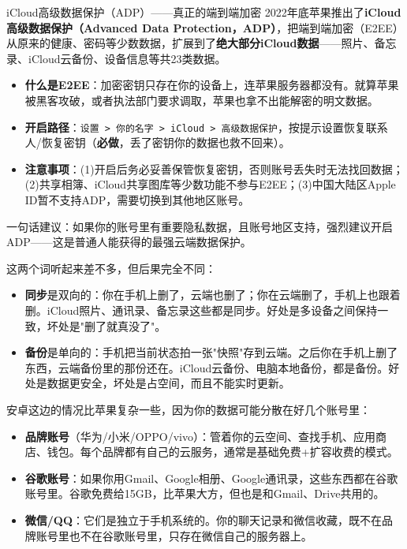 \begin{tcbwarn}{iCloud高级数据保护（ADP）——真正的端到端加密}
2022年底苹果推出了\textbf{iCloud高级数据保护（Advanced Data Protection，ADP）}，把端到端加密（E2EE）从原来的健康、密码等少数数据，扩展到了\textbf{绝大部分iCloud数据}——照片、备忘录、iCloud云备份、设备信息等共23类数据。

\begin{itemize}
  \item \textbf{什么是E2EE}：加密密钥只存在你的设备上，连苹果服务器都没有。就算苹果被黑客攻破，或者执法部门要求调取，苹果也拿不出能解密的明文数据。
  \item \textbf{开启路径}：\texttt{设置 > 你的名字 > iCloud > 高级数据保护}，按提示设置恢复联系人/恢复密钥（\textbf{必做}，丢了密钥你的数据也救不回来）。
  \item \textbf{注意事项}：(1)开启后务必妥善保管恢复密钥，否则账号丢失时无法找回数据；(2)共享相簿、iCloud共享图库等少数功能不参与E2EE；(3)中国大陆区Apple ID暂不支持ADP，需要切换到其他地区账号。
\end{itemize}

一句话建议：如果你的账号里有重要隐私数据，且账号地区支持，强烈建议开启ADP——这是普通人能获得的最强云端数据保护。

\end{tcbwarn}


这两个词听起来差不多，但后果完全不同：

\begin{itemize}
  \item \textbf{同步}是双向的：你在手机上删了，云端也删了；你在云端删了，手机上也跟着删。iCloud照片、通讯录、备忘录这些都是同步。好处是多设备之间保持一致，坏处是"删了就真没了"。
  \item \textbf{备份}是单向的：手机把当前状态拍一张"快照"存到云端。之后你在手机上删了东西，云端备份里的那份还在。iCloud云备份、电脑本地备份，都是备份。好处是数据更安全，坏处是占空间，而且不能实时更新。
\end{itemize}


安卓这边的情况比苹果复杂一些，因为你的数据可能分散在好几个账号里：

\begin{itemize}
  \item \textbf{品牌账号}（华为/小米/OPPO/vivo）：管着你的云空间、查找手机、应用商店、钱包。每个品牌都有自己的云服务，通常是基础免费+扩容收费的模式。
  \item \textbf{谷歌账号}：如果你用Gmail、Google相册、Google通讯录，这些东西都在谷歌账号里。谷歌免费给15GB，比苹果大方，但也是和Gmail、Drive共用的。
  \item \textbf{微信/QQ}：它们是独立于手机系统的。你的聊天记录和微信收藏，既不在品牌账号里也不在谷歌账号里，只存在微信自己的服务器上。
\end{itemize}

